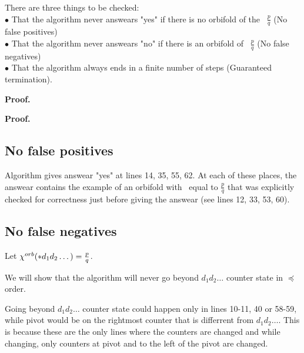 There are three things to be checked: \\
$\bullet$ That the algorithm never answears "yes" if there is no orbifold of the \Eoc\ 
$\frac{p}{q}$ (No false positives)\\
$\bullet$ That the algorithm never answears "no" if there is an orbifold of \Eoc\ 
$\frac{p}{q}$ (No false negatives)\\ 
$\bullet$ That the algorithm always ends in a finite number of steps (Guaranteed termination). 




\begin{lemma}

\end{lemma}
\textbf{Proof.} \\

\begin{lemma}

\end{lemma}
\textbf{Proof.} \\

\subsection{No false positives}
Algorithm gives answear "yes" at lines 14, 35, 55, 62. At each of these places, 
the answear contains the example of an orbifold with \Eoc\ equal to $\frac{p}{q}$ that was 
explicitly checked for correctness just before giving the answear (see lines 12, 33, 53, 60).     
\subsection{No false negatives}
Let ${\chi^{orb}(*d_1d_2\dots)} = \frac{p}{q}$. 

%

We will show that the algorithm will never 
go beyond $d_1d_2\dots$ counter state in $\preceq$ order. 

Going beyond $d_1d_2\dots$ counter state 
could happen only in lines 10-11, 40 or 58-59, while pivot would be 
on the rightmost counter that is differrent from $d_1d_2\dots$. 
This is because these are the only lines where the counters are changed and while changing, 
only counters 
at pivot and to the left of the pivot are changed. 


